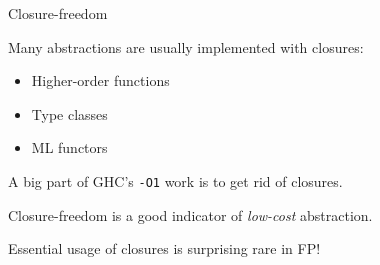 \documentclass[dvipsnames,aspectratio=169]{beamer}
\newcommand{\ttt}[1]{{\texttt{#1}}}
\theoremstyle{remark}
\begin{document}
\begin{frame}[fragile]{Closure-freedom}


Many abstractions are usually implemented with closures:
  \begin{itemize}
    \item Higher-order functions
    \item Type classes
    \item ML functors
  \end{itemize}
\vspace{1em}

A big part of GHC's \texttt{-O1} work is to get rid of closures.
\vspace{1em}

Closure-freedom is a good indicator of \emph{low-cost} abstraction.
\vspace{1em}

Essential usage of closures is surprising rare in FP!


\end{frame}


\end{document}
